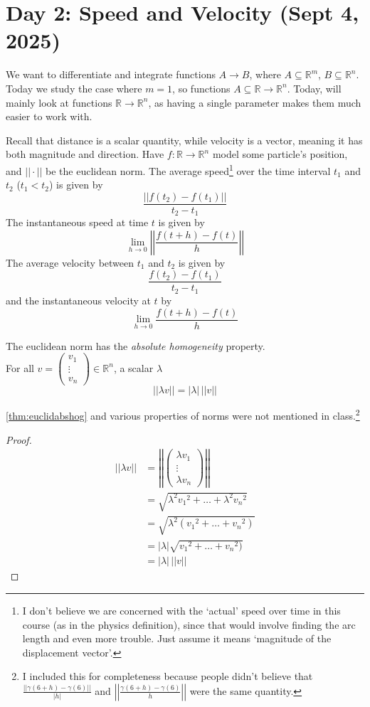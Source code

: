 \section{Day 2: Speed and Velocity (Sept 4, 2025)}

We want to differentiate and integrate functions $A \to B$, where $A \subseteq \mathbb{R}^m$, $B \subseteq \mathbb{R}^n$. Today we study the case where $m = 1$, so functions $A \subseteq \mathbb{R} \to \mathbb{R}^n$. Today, will mainly look at functions $\mathbb{R} \to \mathbb{R}^n$, as having a single parameter makes them much easier to work with.

Recall that distance is a scalar quantity, while velocity is a vector, meaning it has both magnitude and direction. Have $f: \mathbb{R} \to \mathbb{R}^n$ model some particle's position, and $||\cdot||$ be the euclidean norm. The average speed\footnote{I don't believe we are concerned with the `actual' speed over time in this course (as in the physics definition), since that would involve finding the arc length and even more trouble. Just assume it means `magnitude of the displacement vector'.} over the time interval $t_1$ and $t_2$ ($t_1 < t_2$) is given by
\[
\frac{||f(t_2) - f(t_1)||}{t_2-t_1}
\]
The instantaneous speed at time $t$ is given by
\[
\lim_{ h \to 0 } \left|\left|\frac{f(t + h) - f(t)}{h} \right|\right|
\]
The average velocity between $t_1$ and $t_2$ is given by
\[
\frac{f(t_2) - f(t_1)}{t_2 - t_1}
\]
and the instantaneous velocity at $t$ by
\[
\lim_{ h \to 0 } \frac{f(t + h) - f(t)}{h}
\]
\begin{theorem} \label{thm:euclidabshog}
The euclidean norm has the \textit{absolute homogeneity} property. \\
    For all $v = \begin{pmatrix}
v_1 \\ \vdots \\ v_n
\end{pmatrix} \in \mathbb{R}^n$, a scalar $\lambda$
\[
|| \lambda v || = |\lambda| \, ||v||
\]
\end{theorem}
\ref{thm:euclidabshog} and various properties of norms were not mentioned in class.\footnote{I included this for completeness because people didn't believe that $\frac{||\gamma(6 + h) - \gamma(6)||}{|h|}$ and $\left|\left| \frac{\gamma(6 + h) - \gamma(6)}{h} \right|\right|$ were the same quantity.}
\begin{proof}

\begin{align*}
    ||\lambda v|| &= \left|\left|\begin{pmatrix}
\lambda v_1 \\ \vdots \\ \lambda v_n
\end{pmatrix} \right|\right| \\
    &= \sqrt{\lambda^2 {v_1}^2 + \dots + \lambda^2 {v_n}^2} \\
    &= \sqrt{\lambda^2 ({v_1}^2 + \dots + {v_n}^2)} \\
    &= |\lambda| \sqrt{{v_1}^2 + \dots + {v_n}^2)} \\
    &= |\lambda| \, ||v||
\end{align*}

\end{proof}
